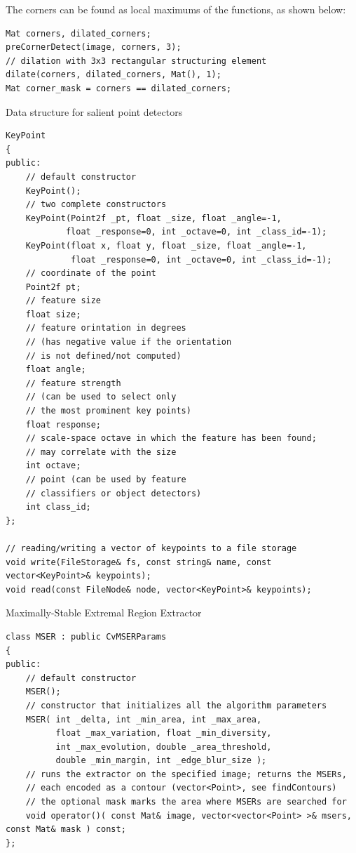 The corners can be found as local maximums of the functions, as shown below:

\begin{lstlisting}
Mat corners, dilated_corners;
preCornerDetect(image, corners, 3);
// dilation with 3x3 rectangular structuring element
dilate(corners, dilated_corners, Mat(), 1);
Mat corner_mask = corners == dilated_corners;
\end{lstlisting}


Data structure for salient point detectors

\begin{lstlisting}
KeyPoint
{
public:
    // default constructor
    KeyPoint();
    // two complete constructors
    KeyPoint(Point2f _pt, float _size, float _angle=-1,
            float _response=0, int _octave=0, int _class_id=-1);
    KeyPoint(float x, float y, float _size, float _angle=-1,
             float _response=0, int _octave=0, int _class_id=-1);
    // coordinate of the point
    Point2f pt;
    // feature size
    float size;
    // feature orintation in degrees
    // (has negative value if the orientation
    // is not defined/not computed)
    float angle;
    // feature strength
    // (can be used to select only
    // the most prominent key points)
    float response;
    // scale-space octave in which the feature has been found;
    // may correlate with the size
    int octave;
    // point (can be used by feature
    // classifiers or object detectors)
    int class_id;
};

// reading/writing a vector of keypoints to a file storage
void write(FileStorage& fs, const string& name, const vector<KeyPoint>& keypoints);
void read(const FileNode& node, vector<KeyPoint>& keypoints);    
\end{lstlisting}


Maximally-Stable Extremal Region Extractor

\begin{lstlisting}
class MSER : public CvMSERParams
{
public:
    // default constructor
    MSER();
    // constructor that initializes all the algorithm parameters
    MSER( int _delta, int _min_area, int _max_area,
          float _max_variation, float _min_diversity,
          int _max_evolution, double _area_threshold,
          double _min_margin, int _edge_blur_size );
    // runs the extractor on the specified image; returns the MSERs,
    // each encoded as a contour (vector<Point>, see findContours)
    // the optional mask marks the area where MSERs are searched for
    void operator()( const Mat& image, vector<vector<Point> >& msers, const Mat& mask ) const;
};
\end{lstlisting}

